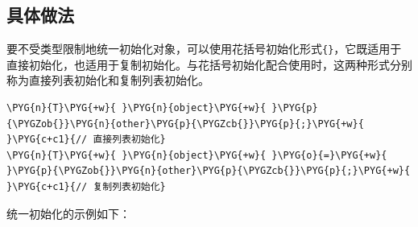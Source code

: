 
\subsection{具体做法}


要不受类型限制地统一初始化对象，可以使用花括号初始化形式\texttt{\{\}}，它既适用于直接初始化，也适用于复制初始化。与花括号初始化配合使用时，这两种形式分别称为直接列表初始化和复制列表初始化。



\begin{codeblockbg}
\begin{Verbatim}[commandchars=\\\{\},breaklines=true,breakanywhere=true,fontsize=\codefont,xleftmargin=17bp]
\PYG{n}{T}\PYG{+w}{ }\PYG{n}{object}\PYG{+w}{ }\PYG{p}{\PYGZob{}}\PYG{n}{other}\PYG{p}{\PYGZcb{}}\PYG{p}{;}\PYG{+w}{   }\PYG{c+c1}{// 直接列表初始化}
\PYG{n}{T}\PYG{+w}{ }\PYG{n}{object}\PYG{+w}{ }\PYG{o}{=}\PYG{+w}{ }\PYG{p}{\PYGZob{}}\PYG{n}{other}\PYG{p}{\PYGZcb{}}\PYG{p}{;}\PYG{+w}{ }\PYG{c+c1}{// 复制列表初始化}
\end{Verbatim}
\end{codeblockbg}



统一初始化的示例如下：



